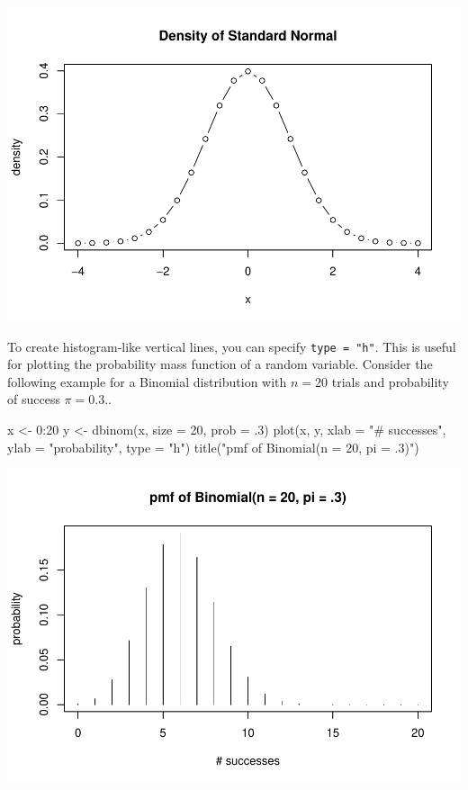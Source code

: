 \documentclass[
]{article}
\newenvironment{Shaded}{\begin{snugshade}}{\end{snugshade}}
\newcommand{\AttributeTok}[1]{\textcolor[rgb]{0.77,0.63,0.00}{#1}}
\newcommand{\DecValTok}[1]{\textcolor[rgb]{0.00,0.00,0.81}{#1}}
\newcommand{\FunctionTok}[1]{\textcolor[rgb]{0.00,0.00,0.00}{#1}}
\newcommand{\NormalTok}[1]{#1}
\newcommand{\OtherTok}[1]{\textcolor[rgb]{0.56,0.35,0.01}{#1}}
\newcommand{\SpecialCharTok}[1]{\textcolor[rgb]{0.00,0.00,0.00}{#1}}
\newcommand{\StringTok}[1]{\textcolor[rgb]{0.31,0.60,0.02}{#1}}
\begin{document}
\includegraphics{crash-course-in-r_files/figure-latex/unnamed-chunk-22-2.pdf}

To create histogram-like vertical lines, you can specify
\texttt{type\ =\ "h"}. This is useful for plotting the probability mass
function of a random variable. Consider the following example for a
Binomial distribution with \(n=20\) trials and probability of success
\(\pi = 0.3\)..

\begin{Shaded}
\begin{Highlighting}[]
\NormalTok{x }\OtherTok{\textless{}{-}} \DecValTok{0}\SpecialCharTok{:}\DecValTok{20}
\NormalTok{y }\OtherTok{\textless{}{-}} \FunctionTok{dbinom}\NormalTok{(x, }\AttributeTok{size =} \DecValTok{20}\NormalTok{, }\AttributeTok{prob =}\NormalTok{ .}\DecValTok{3}\NormalTok{)}
\FunctionTok{plot}\NormalTok{(x, y, }\AttributeTok{xlab =} \StringTok{"\# successes"}\NormalTok{, }\AttributeTok{ylab =} \StringTok{"probability"}\NormalTok{, }\AttributeTok{type =} \StringTok{"h"}\NormalTok{)}
\FunctionTok{title}\NormalTok{(}\StringTok{"pmf of Binomial(n = 20, pi = .3)"}\NormalTok{)}
\end{Highlighting}
\end{Shaded}

\includegraphics{crash-course-in-r_files/figure-latex/unnamed-chunk-23-1.pdf}
\end{document}
